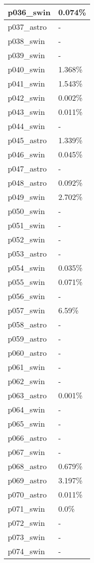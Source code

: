 \documentclass{article}%
\begin{document}
\begin{longtabu}{X[l] X[r]}
\hline%
p036\_swin&0.074\%\\%
\hline%
p037\_astro&{-}\\%
\hline%
p038\_swin&{-}\\%
\hline%
p039\_swin&{-}\\%
\hline%
p040\_swin&1.368\%\\%
\hline%
p041\_swin&1.543\%\\%
\hline%
p042\_swin&0.002\%\\%
\hline%
p043\_swin&0.011\%\\%
\hline%
p044\_swin&{-}\\%
\hline%
p045\_astro&1.339\%\\%
\hline%
p046\_swin&0.045\%\\%
\hline%
p047\_astro&{-}\\%
\hline%
p048\_astro&0.092\%\\%
\hline%
p049\_swin&2.702\%\\%
\hline%
p050\_swin&{-}\\%
\hline%
p051\_swin&{-}\\%
\hline%
p052\_swin&{-}\\%
\hline%
p053\_astro&{-}\\%
\hline%
p054\_swin&0.035\%\\%
\hline%
p055\_swin&0.071\%\\%
\hline%
p056\_swin&{-}\\%
\hline%
p057\_swin&6.59\%\\%
\hline%
p058\_astro&{-}\\%
\hline%
p059\_astro&{-}\\%
\hline%
p060\_astro&{-}\\%
\hline%
p061\_swin&{-}\\%
\hline%
p062\_swin&{-}\\%
\hline%
p063\_astro&0.001\%\\%
\hline%
p064\_swin&{-}\\%
\hline%
p065\_swin&{-}\\%
\hline%
p066\_astro&{-}\\%
\hline%
p067\_swin&{-}\\%
\hline%
p068\_astro&0.679\%\\%
\hline%
p069\_astro&3.197\%\\%
\hline%
p070\_astro&0.011\%\\%
\hline%
p071\_swin&0.0\%\\%
\hline%
p072\_swin&{-}\\%
\hline%
p073\_swin&{-}\\%
\hline%
p074\_swin&{-}\\%

\end{longtabu}
\end{document}
